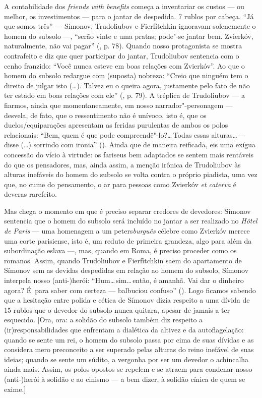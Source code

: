 A contabilidade dos \emph{friends with benefits} começa a inventariar os
custos --- ou melhor, os investimentos --- para o jantar de despedida. 7
rublos por cabeça. ``Já que somos três'' --- Símonov, Trudoliubov e
Fierfítchkin ignoravam solenemente o homem do subsolo ---, ``serão vinte
e uma pratas; pode"-se jantar bem. Zvierkóv, naturalmente, não vai
pagar'' (, p. 78). Quando nosso protagonista se mostra contrafeito e
diz que quer participar do jantar, Trudoliubov sentencia com o cenho
franzido: ``Você nunca esteve em boas relações com Zvierkóv''. Ao que o
homem do subsolo redargue com (suposta) nobreza: ``Creio que ninguém tem
o direito de julgar isto (\ldots). Talvez eu o queira agora, justamente
pelo fato de não ter estado em boas relações com ele'' (, p. 79). A
tréplica de Trudoliubov --- a fiarmos, ainda que momentaneamente, em
nosso narrador"-personagem --- desvela, de fato, que o ressentimento não é
unívoco, isto é, que os duelos/equiparações apresentam as feridas
purulentas de ambos os polos relacionais: ``Bem, quem é que pode
compreendê"-lo?\ldots \,Todas essas alturas\ldots \,--- disse (\ldots) sorrindo com
ironia'' (). Ainda que de maneira reificada, eis uma exígua
concessão do vício à virtude: os fariseus bem adaptados se sentem mais
rentáveis do que os pensadores, mas, ainda assim, a menção irônica de
Trudoliubov às alturas inefáveis do homem do subsolo se volta contra o
próprio piadista, uma vez que, no cume do pensamento, o ar para pessoas
como Zvierkóv \emph{et caterva} é deveras rarefeito.

Mas chega o momento em que é preciso separar credores de devedores:
Símonov sentencia que o homem do subsolo será incluído no jantar a ser
realizado no \emph{Hôtel de Paris} --- uma homenagem a um
peters\emph{burguês} célebre como Zvierkóv merece uma corte parisiense,
isto é, um reduto de primeira grandeza, algo para além da subordinação
eslava ---, mas, quando em Roma, é preciso proceder como os romanos.
Assim, quando Trudoliubov e Fierfítchkin saem do apartamento de Símonov
sem as devidas despedidas em relação ao homem do subsolo, Símonov
interpela nosso \mbox{(anti-)herói}: ``Hum\ldots \,sim\ldots \,então, é amanhã. Vai dar o
dinheiro agora? É~para saber com certeza --- balbuciou confuso''
(). Logo ficamos sabendo que a hesitação entre polida e cética de
Símonov dizia respeito a uma dívida de 15 rublos que o devedor do
subsolo nunca quitara, apesar de jamais a ter esquecido. {[}Ora, ora: a
solidão do subsolo também diz respeito a (ir)responsabilidades que
enfrentam a dialética da altivez e da autoflagelação: quando se sente um
rei, o homem do subsolo passa por cima de suas dívidas e as considera
mero preconceito a ser superado pelas alturas do reino inefável de suas
ideias; quando se sente um súdito, a vergonha por ser um devedor o
achincalha ainda mais. Assim, os polos opostos se repelem e se atraem
para condenar nosso \mbox{(anti-)herói} à solidão e ao cinismo --- a bem dizer,
à solidão cínica de quem se exime.{]}

